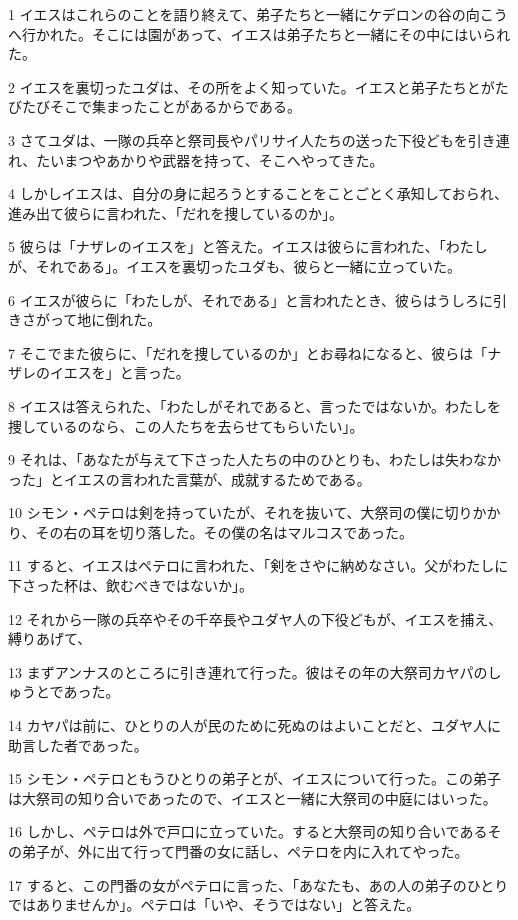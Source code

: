 \par 1 イエスはこれらのことを語り終えて、弟子たちと一緒にケデロンの谷の向こうへ行かれた。そこには園があって、イエスは弟子たちと一緒にその中にはいられた。
\par 2 イエスを裏切ったユダは、その所をよく知っていた。イエスと弟子たちとがたびたびそこで集まったことがあるからである。
\par 3 さてユダは、一隊の兵卒と祭司長やパリサイ人たちの送った下役どもを引き連れ、たいまつやあかりや武器を持って、そこへやってきた。
\par 4 しかしイエスは、自分の身に起ろうとすることをことごとく承知しておられ、進み出て彼らに言われた、「だれを捜しているのか」。
\par 5 彼らは「ナザレのイエスを」と答えた。イエスは彼らに言われた、「わたしが、それである」。イエスを裏切ったユダも、彼らと一緒に立っていた。
\par 6 イエスが彼らに「わたしが、それである」と言われたとき、彼らはうしろに引きさがって地に倒れた。
\par 7 そこでまた彼らに、「だれを捜しているのか」とお尋ねになると、彼らは「ナザレのイエスを」と言った。
\par 8 イエスは答えられた、「わたしがそれであると、言ったではないか。わたしを捜しているのなら、この人たちを去らせてもらいたい」。
\par 9 それは、「あなたが与えて下さった人たちの中のひとりも、わたしは失わなかった」とイエスの言われた言葉が、成就するためである。
\par 10 シモン・ペテロは剣を持っていたが、それを抜いて、大祭司の僕に切りかかり、その右の耳を切り落した。その僕の名はマルコスであった。
\par 11 すると、イエスはペテロに言われた、「剣をさやに納めなさい。父がわたしに下さった杯は、飲むべきではないか」。
\par 12 それから一隊の兵卒やその千卒長やユダヤ人の下役どもが、イエスを捕え、縛りあげて、
\par 13 まずアンナスのところに引き連れて行った。彼はその年の大祭司カヤパのしゅうとであった。
\par 14 カヤパは前に、ひとりの人が民のために死ぬのはよいことだと、ユダヤ人に助言した者であった。
\par 15 シモン・ペテロともうひとりの弟子とが、イエスについて行った。この弟子は大祭司の知り合いであったので、イエスと一緒に大祭司の中庭にはいった。
\par 16 しかし、ペテロは外で戸口に立っていた。すると大祭司の知り合いであるその弟子が、外に出て行って門番の女に話し、ペテロを内に入れてやった。
\par 17 すると、この門番の女がペテロに言った、「あなたも、あの人の弟子のひとりではありませんか」。ペテロは「いや、そうではない」と答えた。
